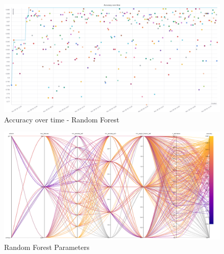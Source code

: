 \documentclass[11pt]{article}
\begin{document}
\begin{appendices}
\newpage
\begin{figure}
    \caption {Accuracy over time - Random Forest} \label{AccOverTimeRF}
    \centering
    \includegraphics[width = \textwidth, height = \textwidth, keepaspectratio]{Images/RF Acc over time.png}
\end{figure}

\newpage
\begin{figure}
    \caption {Random Forest Parameters} \label{ParallelCoordRF}
    \centering
    \includegraphics[width = \textwidth, height = \textwidth, keepaspectratio]{Images/RF ParallelCoordGraph.png}
\end{figure}


\end{appendices}
\end{document}
